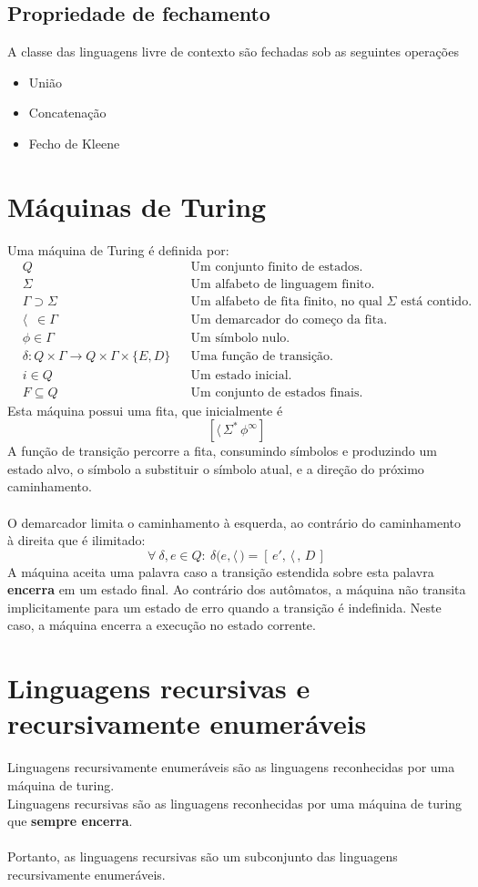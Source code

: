 \documentclass[11pt]{article}
\begin{document}
\subsection{Propriedade de fechamento}
\label{sec:org92d1233}
A classe das linguagens livre de contexto são fechadas sob as seguintes operações
\begin{itemize}[itemsep=0pt]
\item União
\item Concatenação
\item Fecho de Kleene
\end{itemize}
\section{Máquinas de Turing}
\label{sec:org613e9db}
Uma máquina de Turing é definida por:
\begin{align*}
  & Q && \text{Um conjunto finito de estados.} \\
  & \Sigma && \text{Um alfabeto de linguagem finito.} \\
  & \Gamma \supset \Sigma && \text{Um alfabeto de fita finito, no qual $\Sigma$ está contido.} \\
  & \langle \enspace \in \Gamma && \text{Um demarcador do começo da fita.} \\
  & \phi \in \Gamma && \text{Um símbolo nulo.} \\
  & \delta: Q \times \Gamma \to Q \times \Gamma \times \{E, D\} && \text{Uma função de transição.} \\
  & i \in Q && \text{Um estado inicial.} \\
  & F \subseteq Q && \text{Um conjunto de estados finais.}
\end{align*}
Esta máquina possui uma fita, que inicialmente é
\[
  \left[\langle\,\Sigma^*\,\phi^\infty\right]
\]
A função de transição percorre a fita, consumindo símbolos e produzindo um estado alvo,
o símbolo a substituir o símbolo atual, e a direção do próximo
caminhamento. \\ \\
O demarcador limita o caminhamento à esquerda, ao contrário do caminhamento à direita
que é ilimitado:
\[
  \forall\> \delta, e \in Q: \>\delta\big(e, \langle\,\big) = \left[\,e',\, \langle\,,\, D\,\right]
\]
A máquina aceita uma palavra caso a transição estendida sobre esta palavra \textbf{encerra} em um
estado final. Ao contrário dos autômatos, a máquina não transita implicitamente para um
estado de erro quando a transição é indefinida. Neste caso, a máquina encerra a
execução no estado corrente.
\section{Linguagens recursivas e recursivamente enumeráveis}
\label{sec:org7ea069e}
Linguagens recursivamente enumeráveis são as linguagens reconhecidas por uma máquina de
turing. \\
Linguagens recursivas são as linguagens reconhecidas por uma máquina de turing que
\textbf{sempre encerra}. \\ \\
Portanto, as linguagens recursivas são um subconjunto das linguagens recursivamente
enumeráveis.
\end{document}
